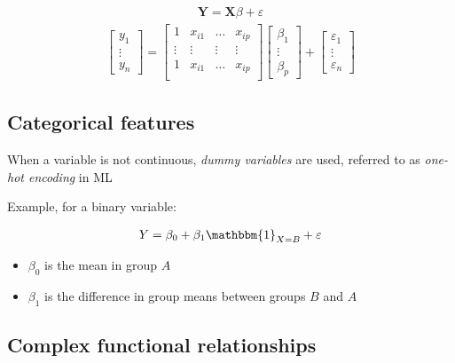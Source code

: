 \documentclass{article}
\begin{document}
\begin{align*}
    \mathbf{Y}=\mathbf{X}\beta+\varepsilon
\end{align*}
\begin{align*}
    \begin{bmatrix}
    y_1 \\
    \vdots \\
    y_n
    \end{bmatrix}
    =
    \begin{bmatrix}
    1 & x_{i1} & \hdots & x_{ip} \\
    \vdots & \vdots & \vdots & \vdots \\
    1 & x_{i1} & \hdots & x_{ip} \\
    \end{bmatrix}
    \begin{bmatrix}
    \beta_1 \\
    \vdots \\
    \beta_p
    \end{bmatrix}
    +
    \begin{bmatrix}
    \varepsilon_1 \\
    \vdots \\
    \varepsilon_n
    \end{bmatrix}
\end{align*}

\subsection{Categorical features}

When a variable is not continuous, \textit{dummy variables} are used, referred to as \textit{one-hot encoding} in ML

Example, for a binary variable:

\begin{align*}
    Y=\beta_0+\beta_1\mathbbm{1}_{X=B}+\varepsilon
\end{align*}

\begin{itemize}
    \item $\beta_0$ is the mean in group $A$
    \item $\beta_1$ is the difference in group means between groups $B$ and $A$
\end{itemize}

\pagebreak

\subsection{Complex functional relationships}
\end{document}
